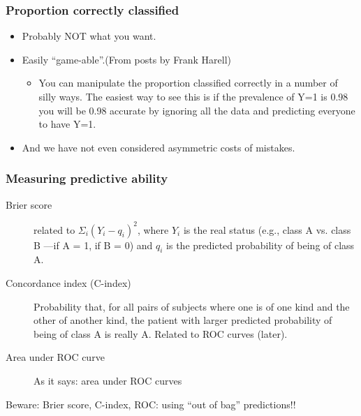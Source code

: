 \begin{frame}
  \frametitle{Proportion correctly classified}
  \begin{itemize}
  \item Probably NOT what you want.
  \item Easily ``game-able''.(From posts by Frank Harell)
    \begin{itemize}
  \item You can manipulate the proportion classified correctly in a number
    of silly ways. The easiest way to see this is if the prevalence of Y=1
    is 0.98 you will be 0.98 accurate by ignoring all the data and
    predicting everyone to have Y=1.
    \end{itemize}
  \item And we have not even considered asymmetric costs of mistakes.
  \end{itemize}
\end{frame}


\begin{frame}
\frametitle{Measuring predictive ability}

\begin{description}

\item[Brier score] related to $\Sigma_i (Y_i - q_i)^2$, where
$Y_i$ is the real status (e.g., class A vs. class B ---if A = 1, if
B = 0)  and $q_i$ is the predicted probability of being of class A.


\item[Concordance index (C-index)] Probability that, for all pairs of subjects
  where one is of one kind and the other of another kind, the patient with
  larger predicted probability of being of class A is really A. Related to
  ROC curves (later).

\item[Area under ROC curve] As it says: area under ROC curves 

\end{description}

Beware: Brier score, C-index, ROC: using ``out of bag'' predictions!!

\end{frame}



